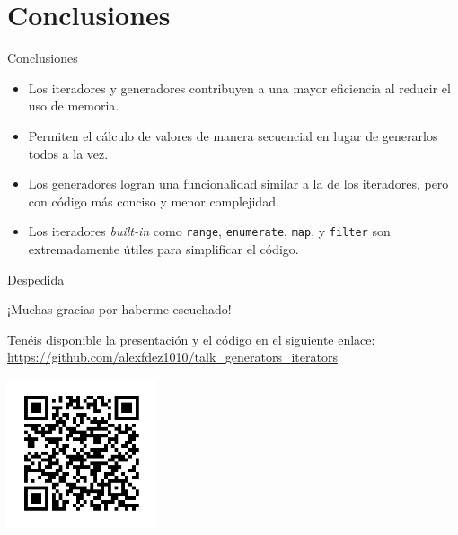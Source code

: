 \documentclass[11pt]{beamer}
\begin{document}
\section{Conclusiones}

\begin{frame}{Conclusiones}
    \begin{itemize}
        \item Los iteradores y generadores contribuyen a una mayor eficiencia al reducir el uso de memoria.
        \item Permiten el cálculo de valores de manera secuencial en lugar de generarlos todos a la vez.
        \item Los generadores logran una funcionalidad similar a la de los iteradores, pero con código más conciso y menor complejidad.
        \item Los iteradores \textit{built-in} como \texttt{range}, \texttt{enumerate}, \texttt{map}, y \texttt{filter} son extremadamente útiles para simplificar el código.
    \end{itemize}
\end{frame}

\begin{frame}{Despedida}
    \begin{center}
        ¡Muchas gracias por haberme escuchado! 
    \end{center}
    \begin{center}
        Tenéis disponible la presentación y el código en el siguiente enlace: \url{https://github.com/alexfdez1010/talk_generators_iterators}
    \end{center}
    \begin{center}
        \includegraphics[width=0.33\textwidth]{qr.png}
    \end{center}
\end{frame}
\end{document}
